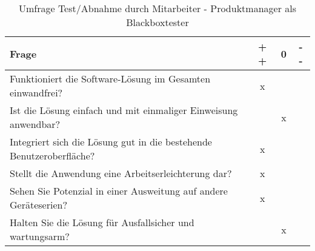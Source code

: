 \begin{table}[ht]
    \begin{center}
        \begin{tabular}{| l | c | c | c |}
            \hline
            \textbf{Frage}                                                       & \textbf{+ +} & \textbf{0} & \textbf{- -} \\
            \hline
            Funktioniert die Software-Lösung im Gesamten einwandfrei?            & x            &            &              \\
            \hline
            Ist die Lösung einfach und mit einmaliger Einweisung anwendbar?      &             & x           &              \\
            \hline
            Integriert sich die Lösung gut in die bestehende Benutzeroberfläche? & x            &            &              \\
            \hline
            Stellt die Anwendung eine Arbeitserleichterung dar?                  & x            &            &              \\
            \hline
            Sehen Sie Potenzial in einer Ausweitung auf andere Geräteserien?     & x            &            &              \\
            \hline
            Halten Sie die Lösung für Ausfallsicher und wartungsarm?             &              & x          &              \\
            \hline
        \end{tabular}
    \end{center}
    \caption{Umfrage Test/Abnahme durch Mitarbeiter - Produktmanager als Blackboxtester }
    \label{umfrage_firma_mk}
\end{table}

